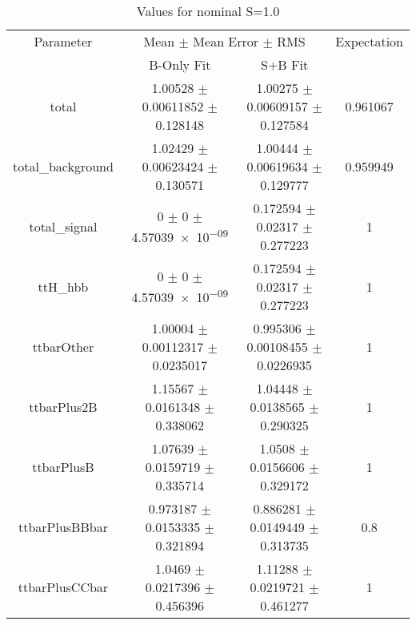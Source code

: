 \begin{table}
\centering
\caption{Values for nominal S=1.0}
\begin{tabular}{cccc}
\toprule
Parameter & \multicolumn{2}{c}{Mean $\pm$ Mean Error $\pm$ RMS} & Expectation\\
 & B-Only Fit & S+B Fit & \\
\midrule
total & \num{1.00528} $\pm$ \num{0.00611852} $\pm$ \num{0.128148} & \num{1.00275} $\pm$ \num{0.00609157} $\pm$ \num{0.127584} & \num{0.961067}\\
total\_background & \num{1.02429} $\pm$ \num{0.00623424} $\pm$ \num{0.130571} & \num{1.00444} $\pm$ \num{0.00619634} $\pm$ \num{0.129777} & \num{0.959949}\\
total\_signal & \num{0} $\pm$ \num{0} $\pm$ \num{4.57039e-09} & \num{0.172594} $\pm$ \num{0.02317} $\pm$ \num{0.277223} & \num{1}\\
ttH\_hbb & \num{0} $\pm$ \num{0} $\pm$ \num{4.57039e-09} & \num{0.172594} $\pm$ \num{0.02317} $\pm$ \num{0.277223} & \num{1}\\
ttbarOther & \num{1.00004} $\pm$ \num{0.00112317} $\pm$ \num{0.0235017} & \num{0.995306} $\pm$ \num{0.00108455} $\pm$ \num{0.0226935} & \num{1}\\
ttbarPlus2B & \num{1.15567} $\pm$ \num{0.0161348} $\pm$ \num{0.338062} & \num{1.04448} $\pm$ \num{0.0138565} $\pm$ \num{0.290325} & \num{1}\\
ttbarPlusB & \num{1.07639} $\pm$ \num{0.0159719} $\pm$ \num{0.335714} & \num{1.0508} $\pm$ \num{0.0156606} $\pm$ \num{0.329172} & \num{1}\\
ttbarPlusBBbar & \num{0.973187} $\pm$ \num{0.0153335} $\pm$ \num{0.321894} & \num{0.886281} $\pm$ \num{0.0149449} $\pm$ \num{0.313735} & \num{0.8}\\
ttbarPlusCCbar & \num{1.0469} $\pm$ \num{0.0217396} $\pm$ \num{0.456396} & \num{1.11288} $\pm$ \num{0.0219721} $\pm$ \num{0.461277} & \num{1}\\
\bottomrule
\end{tabular}
\end{table}